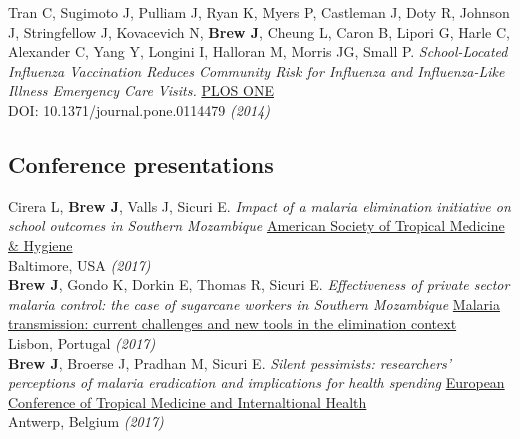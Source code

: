 \documentclass[11pt]{article}
\begin{document}
\noindent Tran C, Sugimoto J, Pulliam J, Ryan K, Myers P, Castleman J, Doty R, Johnson J, Stringfellow J, Kovacevich N, \textbf{Brew J}, Cheung L, Caron B, Lipori G, Harle C, Alexander C, Yang Y, Longini I, Halloran M, Morris JG, Small P. \emph{School-Located Influenza Vaccination Reduces Community Risk for Influenza and Influenza-Like Illness Emergency Care Visits.} \href{http://journals.plos.org/plosone/article?id=10.1371/journal.pone.0114479}{PLOS ONE} \\
DOI: 10.1371/journal.pone.0114479 \hfill \emph{(2014)}\\

% 


\subsection*{Conference presentations}



\noindent Cirera L, \textbf{Brew J}, Valls J, Sicuri E. \emph{Impact of a malaria elimination initiative on school outcomes in Southern Mozambique} \href{http://www.astmh.org/annual-meeting}{American Society of Tropical Medicine & Hygiene} \\
Baltimore, USA \hfill \emph{(2017)}\\

\noindent \textbf{Brew J}, Gondo K, Dorkin E, Thomas R, Sicuri E. \emph{Effectiveness of private sector malaria control: the case of sugarcane workers in Southern Mozambique} \href{http://www.ihmt.unl.pt/en/workshop-malaria-transmission-en/}{Malaria transmission: current challenges and new tools in the elimination context} \\
Lisbon, Portugal \hfill \emph{(2017)}\\

\noindent \textbf{Brew J}, Broerse J, Pradhan M, Sicuri E. \emph{Silent pessimists: researchers' perceptions of malaria eradication and implications for health spending} \href{http://www.ectmih2017.be/}{European Conference of Tropical Medicine and Internaltional Health} \\
Antwerp, Belgium \hfill \emph{(2017)}\\
\end{document}
